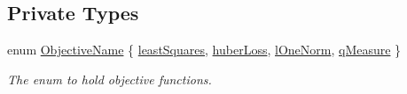 \subsection*{Private Types}
\begin{DoxyCompactItemize}
\item 
enum \hyperlink{classObjective_ac2cb31fca71c5a4b99b35c879742644c}{Objective\+Name} \{ \hyperlink{classObjective_ac2cb31fca71c5a4b99b35c879742644ca205a754a7295726fb0a2ed5411d441db}{least\+Squares}, 
\hyperlink{classObjective_ac2cb31fca71c5a4b99b35c879742644ca5bd3f1f14a20e6a7c1657b530c4ec570}{huber\+Loss}, 
\hyperlink{classObjective_ac2cb31fca71c5a4b99b35c879742644ca1d16b67c79d69d3ab4255e9bf0bc7c03}{l\+One\+Norm}, 
\hyperlink{classObjective_ac2cb31fca71c5a4b99b35c879742644ca85b3185f17ead6c164f096c2f337ed79}{q\+Measure}
 \}\begin{DoxyCompactList}\small\item\em The enum to hold objective functions. \end{DoxyCompactList}
\end{DoxyCompactItemize}

